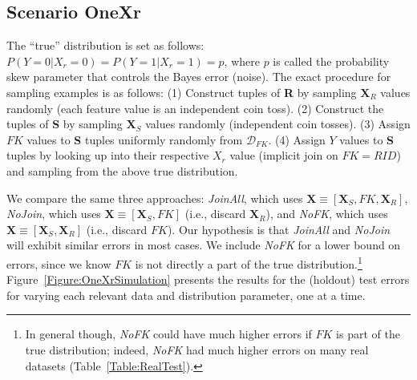\documentclass[sigconf]{acmart}
\begin{document}
\vspace{-1mm}
\subsection{Scenario OneXr}

The ``true'' distribution is set as follows: $P(Y=0|X_r=0)=P(Y=1|X_r=1)=p$, where $p$ is called the probability skew parameter that controls the Bayes error (noise).
The exact procedure for sampling examples is as follows: (1) Construct tuples of \textbf{R} by sampling $\textbf{X}_R$ values randomly (each feature value 
is an independent coin toss). (2) Construct the tuples of \textbf{S} by sampling $\textbf{X}_S$ values randomly (independent coin tosses). (3) Assign $FK$ 
values to \textbf{S} tuples uniformly randomly from $\mathcal{D}_{FK}$. (4) Assign $Y$ values to \textbf{S} tuples by looking up into their respective $X_r$ 
value (implicit join on $FK = RID$) and sampling from the above true distribution.

We compare the same three approaches: \textit{JoinAll}, which uses $\textbf{X} \equiv [\textbf{X}_S, FK, \textbf{X}_R]$, 
\textit{NoJoin}, which uses $\textbf{X} \equiv [\textbf{X}_S, FK]$ (i.e., discard $\textbf{X}_R$), and \textit{NoFK}, 
which uses $\textbf{X} \equiv [\textbf{X}_S, \textbf{X}_R]$ (i.e., discard $FK$).
Our hypothesis is that \textit{JoinAll} and \textit{NoJoin} will exhibit similar errors in most cases. 
We include \textit{NoFK} for a lower bound on errors, since we know $FK$ is not directly a part of the true 
distribution.\footnote{In general though, \textit{NoFK} could have much higher errors if $FK$ is part of the true distribution; indeed, \textit{NoFK} had 
much higher errors on many real datasets (Table~\ref{Table:RealTest}).}
Figure~\ref{Figure:OneXrSimulation} presents the results for the (holdout) test errors for varying each relevant data and distribution parameter, one at a time.
\end{document}
